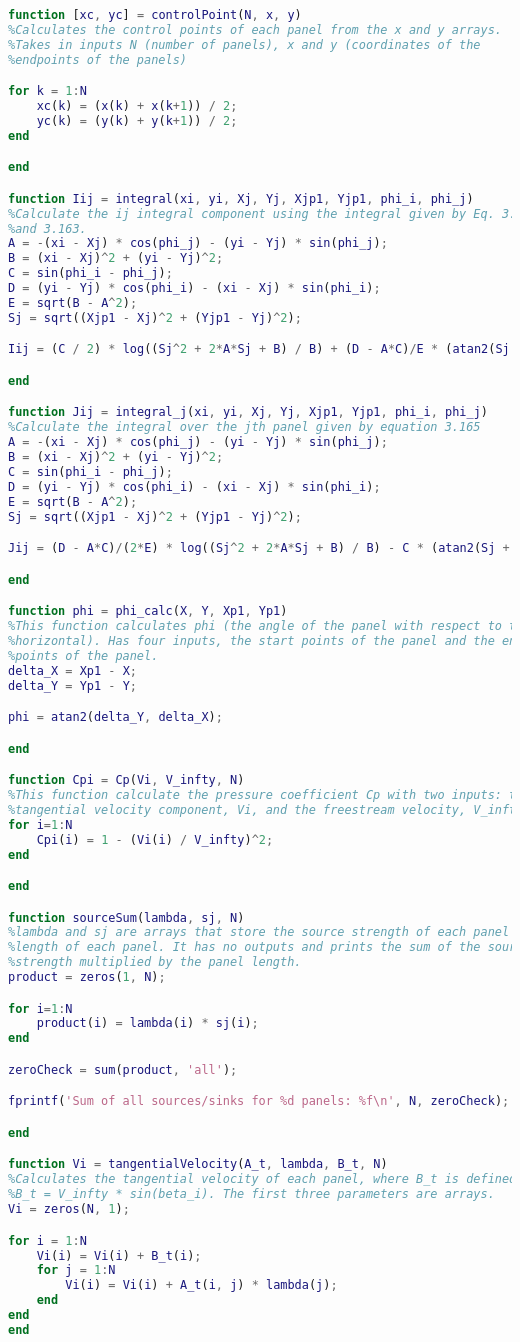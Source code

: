 \documentclass[12pt]{article}
\begin{document}
\begin{lstlisting}[language=Matlab]
function [xc, yc] = controlPoint(N, x, y)
%Calculates the control points of each panel from the x and y arrays.
%Takes in inputs N (number of panels), x and y (coordinates of the
%endpoints of the panels)

for k = 1:N
    xc(k) = (x(k) + x(k+1)) / 2;
    yc(k) = (y(k) + y(k+1)) / 2;
end

end

function Iij = integral(xi, yi, Xj, Yj, Xjp1, Yjp1, phi_i, phi_j)
%Calculate the ij integral component using the integral given by Eq. 3.162
%and 3.163.
A = -(xi - Xj) * cos(phi_j) - (yi - Yj) * sin(phi_j);
B = (xi - Xj)^2 + (yi - Yj)^2;
C = sin(phi_i - phi_j);
D = (yi - Yj) * cos(phi_i) - (xi - Xj) * sin(phi_i);
E = sqrt(B - A^2);
Sj = sqrt((Xjp1 - Xj)^2 + (Yjp1 - Yj)^2);

Iij = (C / 2) * log((Sj^2 + 2*A*Sj + B) / B) + (D - A*C)/E * (atan2(Sj + A, E) - atan2(A, E));

end

function Jij = integral_j(xi, yi, Xj, Yj, Xjp1, Yjp1, phi_i, phi_j)
%Calculate the integral over the jth panel given by equation 3.165
A = -(xi - Xj) * cos(phi_j) - (yi - Yj) * sin(phi_j);
B = (xi - Xj)^2 + (yi - Yj)^2;
C = sin(phi_i - phi_j);
D = (yi - Yj) * cos(phi_i) - (xi - Xj) * sin(phi_i);
E = sqrt(B - A^2);
Sj = sqrt((Xjp1 - Xj)^2 + (Yjp1 - Yj)^2);

Jij = (D - A*C)/(2*E) * log((Sj^2 + 2*A*Sj + B) / B) - C * (atan2(Sj + A, E) - atan2(A, E));

end

function phi = phi_calc(X, Y, Xp1, Yp1)
%This function calculates phi (the angle of the panel with respect to the
%horizontal). Has four inputs, the start points of the panel and the end
%points of the panel.
delta_X = Xp1 - X;
delta_Y = Yp1 - Y;

phi = atan2(delta_Y, delta_X);

end

function Cpi = Cp(Vi, V_infty, N)
%This function calculate the pressure coefficient Cp with two inputs: the
%tangential velocity component, Vi, and the freestream velocity, V_infty.
for i=1:N
    Cpi(i) = 1 - (Vi(i) / V_infty)^2;
end

end

function sourceSum(lambda, sj, N)
%lambda and sj are arrays that store the source strength of each panel and
%length of each panel. It has no outputs and prints the sum of the source
%strength multiplied by the panel length.
product = zeros(1, N);

for i=1:N
    product(i) = lambda(i) * sj(i);
end

zeroCheck = sum(product, 'all');

fprintf('Sum of all sources/sinks for %d panels: %f\n', N, zeroCheck);

end

function Vi = tangentialVelocity(A_t, lambda, B_t, N)
%Calculates the tangential velocity of each panel, where B_t is defined by
%B_t = V_infty * sin(beta_i). The first three parameters are arrays.
Vi = zeros(N, 1);

for i = 1:N
    Vi(i) = Vi(i) + B_t(i);
    for j = 1:N
        Vi(i) = Vi(i) + A_t(i, j) * lambda(j);
    end
end
end
\end{lstlisting}
\end{document}
